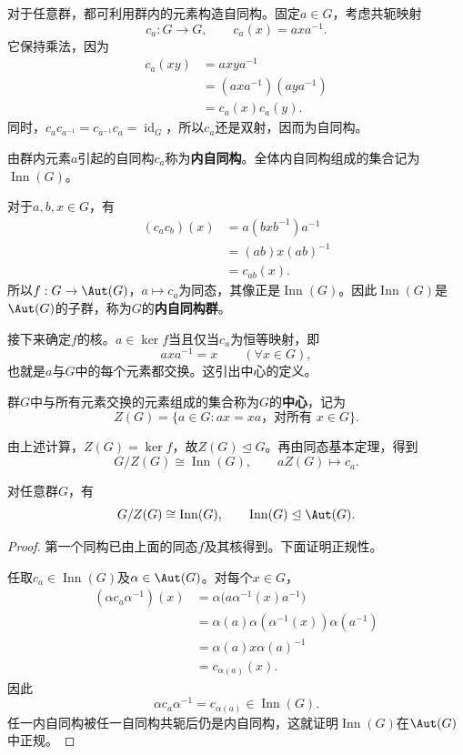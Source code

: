 对于任意群，都可利用群内的元素构造自同构。固定$a\in G$，考虑共轭映射
\[
c_a:G\longrightarrow G,\qquad c_a(x)=axa^{-1}.
\]
它保持乘法，因为
\begin{align*}
c_a(xy)&=axya^{-1}\\
&=(axa^{-1})(aya^{-1})\\
&=c_a(x)c_a(y).
\end{align*}
同时，$c_a c_{a^{-1}}=c_{a^{-1}}c_a=\operatorname{id}_G$，所以$c_a$还是双射，因而为自同构。

\begin{definition}
由群内元素$a$引起的自同构$c_a$称为\textbf{内自同构}。全体内自同构组成的集合记为$\operatorname{Inn}(G)$。
\end{definition}

对于$a,b,x\in G$，有
\begin{align*}
(c_a c_b)(x)&=a(bxb^{-1})a^{-1}\\
&=(ab)x(ab)^{-1}\\
&=c_{ab}(x).
\end{align*}
所以$f:G\to\Aut(G)$，$a\mapsto c_a$为同态，其像正是$\operatorname{Inn}(G)$。因此$\operatorname{Inn}(G)$是$\Aut(G)$的子群，称为$G$的\textbf{内自同构群}。

接下来确定$f$的核。$a\in\ker f$当且仅当$c_a$为恒等映射，即
\[
axa^{-1}=x\qquad(\forall x\in G),
\]
也就是$a$与$G$中的每个元素都交换。这引出中心的定义。

\begin{definition}
群$G$中与所有元素交换的元素组成的集合称为$G$的\textbf{中心}，记为
\[
Z(G)=\{a\in G:ax=xa\text{，对所有 }x\in G\}.
\]
\end{definition}

由上述计算，$Z(G)=\ker f$，故$Z(G)\trianglelefteq G$。再由同态基本定理，得到
\[
G/Z(G)\cong\operatorname{Inn}(G),\qquad aZ(G)\longmapsto c_a.
\]

\begin{theorem}\label{p2:inner-aut}
对任意群$G$，有
\[
G/Z(G)\cong\operatorname{Inn}(G),\qquad
\operatorname{Inn}(G)\trianglelefteq\Aut(G).
\]
\end{theorem}
\begin{proof}
第一个同构已由上面的同态$f$及其核得到。下面证明正规性。

任取$c_a\in\operatorname{Inn}(G)$及$\alpha\in\Aut(G)$。对每个$x\in G$，
\begin{align*}
(\alpha c_a\alpha^{-1})(x)
&=\alpha\bigl(a\alpha^{-1}(x)a^{-1}\bigr)\\
&=\alpha(a)\alpha(\alpha^{-1}(x))\alpha(a^{-1})\\
&=\alpha(a)x\alpha(a)^{-1}\\
&=c_{\alpha(a)}(x).
\end{align*}
因此
\[
\alpha c_a\alpha^{-1}=c_{\alpha(a)}\in\operatorname{Inn}(G).
\]
任一内自同构被任一自同构共轭后仍是内自同构，这就证明$\operatorname{Inn}(G)$在$\Aut(G)$中正规。
\end{proof}

